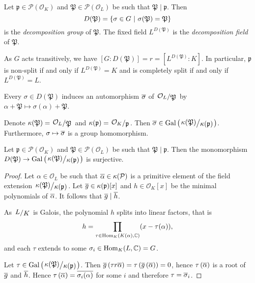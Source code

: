 \begin{definicija}
Let $\mathfrak{p} \in \mathcal{P}(\mathcal{O}_K)$ and
$\mathfrak{P} \in \mathcal{P}(\mathcal{O}_L)$ be such that
$\mathfrak{P} \mid \mathfrak{p}$. Then
\[
D(\mathfrak{P}) =
\left\{\sigma \in G~\middle\vert~\sigma(\mathfrak{P}) = \mathfrak{P}\right\}
\]
is the \emph{decomposition group}
of $\mathfrak{P}$. The fixed field $L^{D(\mathfrak{P})}$ is the
\emph{decomposition field} of $\mathfrak{P}$.
\end{definicija}

\begin{opomba}
As $G$ acts transitively, we have
$[G : D(\mathfrak{P})] = r = [L^{D(\mathfrak{P})} : K]$. In
particular, $\mathfrak{p}$ is non-split if and only if
$L^{D(\mathfrak{P})} = K$ and is completely split if and only if
$L^{D(\mathfrak{P})} = L$.
\end{opomba}

\begin{opomba}
Every $\sigma \in D(\mathfrak{P})$ induces an automorphism
$\overline{\sigma}$ of $\kvoc{\mathcal{O}_L}{\mathfrak{P}}$ by
$\alpha + \mathfrak{P} \mapsto \sigma(\alpha) + \mathfrak{P}$.
\end{opomba}

\begin{opomba}
Denote $\kappa(\mathfrak{P}) = \kvoc{\mathcal{O}_L}{\mathfrak{P}}$
and $\kappa(\mathfrak{p}) = \kvoc{\mathcal{O}_K}{\mathfrak{p}}$.
Then $\oline{\sigma} \in
\Gal \br{\kvoc{\kappa(\mathfrak{P})}{\kappa(\mathfrak{p})}}$.
Furthermore, $\sigma \mapsto \overline{\sigma}$ is a group
homomorphism.
\end{opomba}

\begin{trditev}
Let $\mathfrak{p} \in \mathcal{P}(\mathcal{O}_K)$ and
$\mathfrak{P} \in \mathcal{P}(\mathcal{O}_L)$ be such that
$\mathfrak{P} \mid \mathfrak{p}$. Then the monomorphism
$D(\mathfrak{P}) \to
\Gal \br{\kvoc{\kappa(\mathfrak{P})}{\kappa(\mathfrak{p})}}$ is
surjective.
\end{trditev}

\begin{proof}
Let $\alpha \in \mathcal{O}_L$ be such that
$\overline{\alpha} \in \kappa(\mathcal{P})$ is a primitive element of
the field extension
$\kvoc{\kappa(\mathfrak{P})}{\kappa(\mathfrak{p})}$. Let
$\overline{g} \in \kappa(\mathfrak{p})[x]$ and
$h \in \mathcal{O}_K[x]$ be the minimal polynomials of
$\overline{\alpha}$. It follows that $\overline{g} \mid \overline{h}$.

As $\kvoc{L}{K}$ is Galois, the polynomial $h$ splits into linear
factors, that is
\[
h = \prod_{\tau \in \operatorname{Hom}_K(K(\alpha), \mathbb{C})} (x - \tau(\alpha)),
\]
and each $\tau$ extends to some $\sigma_i \in \operatorname{Hom}_K(L, \mathbb{C}) = G$.


Let $\tau \in
\Gal \br{\kvoc{\kappa(\mathfrak{P})}{\kappa(\mathfrak{p})}}$. Then
$\overline{g} \left(\tau {r{\overline{\alpha}}}\right) =
\tau \left(\overline{g} \left(\overline{\alpha}\right)\right) = 0$, hence
$\tau \left(\overline{\alpha}\right)$ is a root of $\overline{g}$ and
$\overline{h}$. Hence
$\tau \left(\overline{\alpha}\right) = \overline{\sigma_i(\alpha)}$ for some $i$
and therefore $\tau = \overline{\sigma}_i$.
\end{proof}

